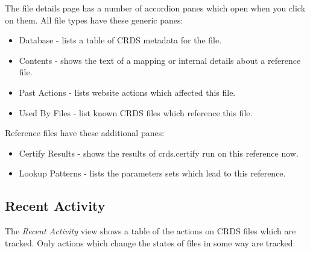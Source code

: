 \documentclass[letterpaper,10pt,english]{sphinxmanual}
\begin{document}
The file details page has a number of accordion panes which open when you
click on them.  All file types have these generic panes:
\begin{itemize}
\item {} 
Database - lists a table of CRDS metadata for the file.

\item {} 
Contents - shows the text of a mapping or internal details about a reference file.

\item {} 
Past Actions  - lists website actions which affected this file.

\item {} 
Used By Files - list known CRDS files which reference this file.

\end{itemize}

Reference files have these additional panes:
\begin{itemize}
\item {} 
Certify Results - shows the results of crds.certify run on this reference now.

\item {} 
Lookup Patterns - lists the parameters sets which lead to this reference.

\end{itemize}


\subsection{Recent Activity}
\label{web_site_use:recent-activity}
The \emph{Recent Activity} view shows a table of the actions on CRDS files which
are tracked.  Only actions which change the states of files in some way are
tracked:
\begin{figure}[htbp]
\centering

\end{figure}
\end{document}
